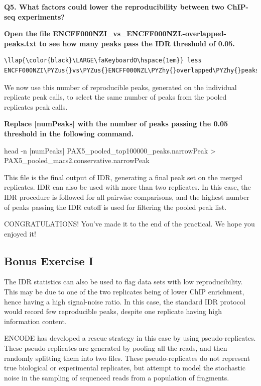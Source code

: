 \documentclass[11pt]{article}
\def\PYZus{\char`\_}
\def\PYZhy{\char`\-}
\begin{document}
    \textbf{Q5. What factors could lower the reproducibility between two
ChIP-seq experiments?}

\newpage

    \textbf{Open the file ENCFF000NZI\_vs\_ENCFF000NZL-overlapped-peaks.txt
to see how many peaks pass the IDR threshold of 0.05.}

\begin{terminalinput}
\begin{Verbatim}[commandchars=\\\{\}]
\llap{\color{black}\LARGE\faKeyboardO\hspace{1em}} less ENCFF000NZI\PYZus{}vs\PYZus{}ENCFF000NZL\PYZhy{}overlapped\PYZhy{}peaks.txt
\end{Verbatim}
\end{terminalinput}


    We now use this number of reproducible peaks, generated on the
individual replicate peak calls, to select the same number of peaks from
the pooled replicates peak calls.

    \textbf{Replace {[}numPeaks{]} with the number of peaks passing the 0.05
threshold in the following command.}

    head -n {[}numPeaks{]} PAX5\_pooled\_top100000\_peaks.narrowPeak
\textgreater{} PAX5\_pooled\_macs2.conservative.narrowPeak

    This file is the final output of IDR, generating a final peak set on the
merged replicates. IDR can also be used with more than two replicates.
In this case, the IDR procedure is followed for all pairwise
comparisons, and the highest number of peaks passing the IDR cutoff is
used for filtering the pooled peak list.

    CONGRATULATIONS! You've made it to the end of the practical. We hope you
enjoyed it!

    \subsection{Bonus Exercise I}\label{bonus-exercise-i}

The IDR statistics can also be used to flag data sets with low
reproducibility. This may be due to one of the two replicates being of
lower ChIP enrichment, hence having a high signal-noise ratio. In this
case, the standard IDR protocol would record few reproducible peaks,
despite one replicate having high information content.

ENCODE has developed a rescue strategy in this case by using
pseudo-replicates. These pseudo-replicates are generated by pooling all
the reads, and then randomly splitting them into two files. These
pseudo-replicates do not represent true biological or experimental
replicates, but attempt to model the stochastic noise in the sampling of
sequenced reads from a population of fragments.
\end{document}
